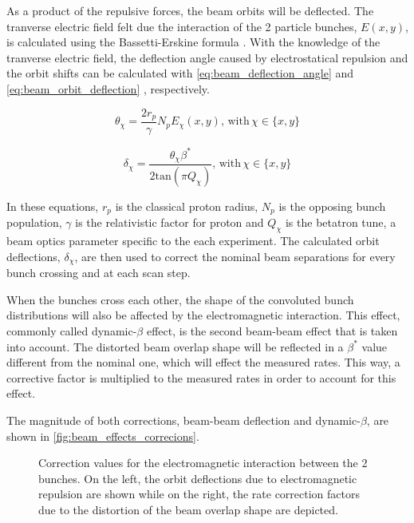 As a product of the repulsive forces, the beam orbits will be deflected. The tranverse electric field felt due the interaction of the 2 particle bunches, $E(x, y)$, is calculated using the Bassetti-Erskine formula \cite{Bassetti:122227}. With the knowledge of the tranverse electric field, the deflection angle caused by electrostatical repulsion and the orbit shifts can be calculated with \autoref{eq:beam_deflection_angle} and \autoref{eq:beam_orbit_deflection} \cite{PhysRevLett.62.2949}, respectively.

\begin{equation}
	\theta_{\chi} = \frac{2r_p}{\gamma} N_p E_{\chi}(x, y), \, \mathrm{with} \, \chi \in \{ x, y \}
	\label{eq:beam_deflection_angle}
\end{equation}

\begin{equation}
	\delta_{\chi} = \frac{\theta_{\chi} \beta^{*}}{2 \mathrm{tan} \left( \pi Q_{\chi} \right)}, \, \mathrm{with} \, \chi \in \{ x, y \}
	\label{eq:beam_orbit_deflection}
\end{equation}

In these equations, $r_p$ is the classical proton radius, $N_p$ is the opposing bunch population, $\gamma$ is the relativistic factor for proton and $Q_{\chi}$ is the betatron tune, a beam optics parameter specific to the each experiment. The calculated orbit deflections, $\delta_{\chi}$, are then used to correct the nominal beam separations for every bunch crossing and at each scan step.

When the bunches cross each other, the shape of the convoluted bunch distributions will also be affected by the electromagnetic interaction. This effect, commonly called dynamic-$\beta$ effect, is the second beam-beam effect that is taken into account. The distorted beam overlap shape will be reflected in a $\beta^{*}$ value different from the nominal one, which will effect the measured rates. This way, a corrective factor is multiplied to the measured rates in order to account for this effect.

The magnitude of both corrections, beam-beam deflection and dynamic-$\beta$, are shown in \autoref{fig:beam_effects_correcions}.

\begin{figure}[!htb]
	\centering
	\caption{Correction values for the electromagnetic interaction between the 2 bunches. On the left, the orbit deflections due to electromagnetic repulsion are shown while on the right, the rate correction factors due to the distortion of the beam overlap shape are depicted.}
	\label{fig:beam_effects_correcions}
\end{figure}

